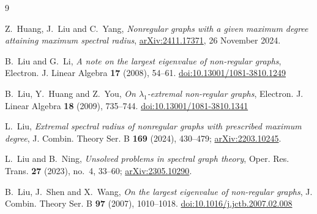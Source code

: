 \documentclass[11pt]{amsart}
\theoremstyle{definition}
\begin{document}
\begin{thebibliography}{9}

Z.~Huang, J.~Liu and C.~Yang,
\emph{Nonregular graphs with a given maximum degree attaining maximum spectral
radius},
\href{https://arxiv.org/abs/2411.17371}{arXiv:2411.17371}, 26 November 2024.

B.~Liu and G.~Li,
\emph{A note on the largest eigenvalue of non-regular graphs},
Electron. J. Linear Algebra \textbf{17} (2008), 54--61.
\href{https://doi.org/10.13001/1081-3810.1249}{doi:10.13001/1081-3810.1249}

B.~Liu, Y.~Huang and Z.~You,
\emph{On $\lambda_1$-extremal non-regular graphs},
Electron. J. Linear Algebra \textbf{18} (2009), 735--744.
\href{https://doi.org/10.13001/1081-3810.1341}{doi:10.13001/1081-3810.1341}

L.~Liu,
\emph{Extremal spectral radius of nonregular graphs with prescribed maximum
degree},
J. Combin. Theory Ser. B \textbf{169} (2024), 430--479;
\href{https://arxiv.org/abs/2203.10245}{arXiv:2203.10245}.

L.~Liu and B.~Ning,
\emph{Unsolved problems in spectral graph theory},
Oper. Res. Trans. \textbf{27} (2023), no.~4, 33--60;
\href{https://arxiv.org/abs/2305.10290}{arXiv:2305.10290}.

B.~Liu, J.~Shen and X.~Wang,
\emph{On the largest eigenvalue of non-regular graphs},
J. Combin. Theory Ser. B \textbf{97} (2007), 1010--1018.
\href{https://doi.org/10.1016/j.jctb.2007.02.008}{doi:10.1016/j.jctb.2007.02.008}

\end{thebibliography}
\end{document}

